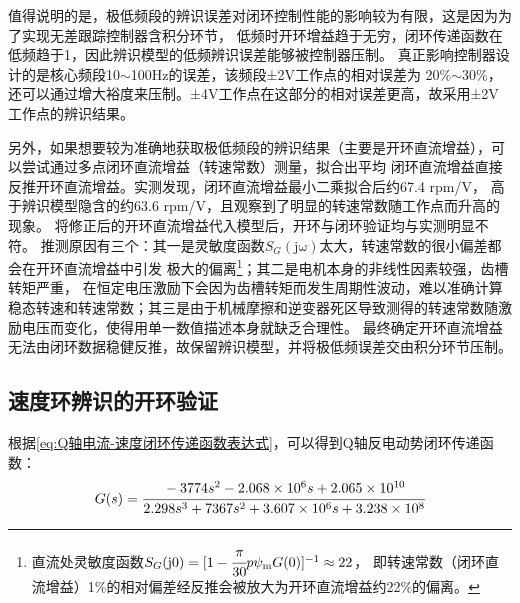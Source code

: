 值得说明的是，极低频段的辨识误差对闭环控制性能的影响较为有限，这是因为为了实现无差跟踪控制器含积分环节，
低频时开环增益趋于无穷，闭环传递函数在低频趋于1，因此辨识模型的低频辨识误差能够被控制器压制。
真正影响控制器设计的是核心频段10\(\sim\)100Hz的误差，该频段±2V工作点的相对误差为
20\%\(\sim\)30\%，还可以通过增大裕度来压制。±4V工作点在这部分的相对误差更高，故采用±2V工作点的辨识结果。

另外，如果想要较为准确地获取极低频段的辨识结果（主要是开环直流增益），可以尝试通过多点闭环直流增益（转速常数）测量，拟合出平均
闭环直流增益直接反推开环直流增益。实测发现，闭环直流增益最小二乘拟合后约67.4 rpm/V，
高于辨识模型隐含的约63.6 rpm/V，且观察到了明显的转速常数随工作点而升高的现象。
将修正后的开环直流增益代入模型后，开环与闭环验证均与实测明显不符。
推测原因有三个：其一是灵敏度函数\(S_{G}(\mathrm{j\omega})\)太大，转速常数的很小偏差都会在开环直流增益中引发
极大的偏离\footnote{直流处灵敏度函数\(S_G(\mathrm{j}0)=[1-\cfrac{\pi}{30}p\psi_{\mathrm{m}}G(0)]^{-1}\approx 22\)，
即转速常数（闭环直流增益）1\%的相对偏差经反推会被放大为开环直流增益约22\%的偏离。}；其二是电机本身的非线性因素较强，齿槽转矩严重，
在恒定电压激励下会因为齿槽转矩而发生周期性波动，难以准确计算
稳态转速和转速常数；其三是由于机械摩擦和逆变器死区导致测得的转速常数随激励电压而变化，使得用单一数值描述本身就缺乏合理性。
最终确定开环直流增益无法由闭环数据稳健反推，故保留辨识模型，并将极低频误差交由积分环节压制。

\subsection{速度环辨识的开环验证}
根据\eqref{eq:Q轴电流-速度闭环传递函数表达式}，可以得到Q轴反电动势闭环传递函数：
\begin{equation*}
    G(s)=\cfrac{-3774 s^2 - 2.068\times10^6 s + 2.065\times 10^{10}}
    {2.298 s^3 + 7367 s^2 + 3.607\times 10^6 s +3.238\times 10^{8}}
\end{equation*}

